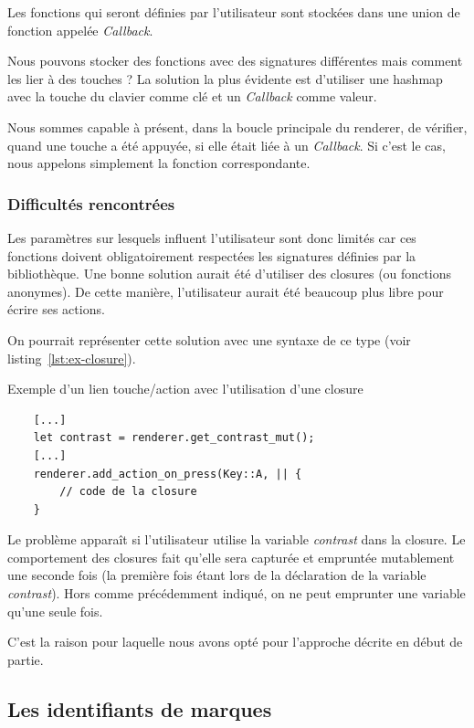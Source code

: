 \documentclass[12pt]{article}
\begin{document}
Les fonctions qui seront définies par l'utilisateur sont stockées dans une union de fonction appelée \textit{Callback}.

Nous pouvons stocker des fonctions avec des signatures différentes mais
comment les lier à des touches ?
La solution la plus évidente est d'utiliser une hashmap avec la touche du clavier comme clé et un \textit{Callback} comme valeur.

Nous sommes capable à présent, dans la boucle principale du renderer, de vérifier, quand
une touche a été appuyée, si elle était liée à un \textit{Callback}. Si c'est le cas,
nous appelons simplement la fonction correspondante.

\subsubsection{Difficultés rencontrées}

Les paramètres sur lesquels influent l'utilisateur sont donc limités car ces fonctions
doivent obligatoirement respectées les signatures définies par la bibliothèque.
Une bonne solution aurait été d'utiliser des closures (ou fonctions anonymes). De cette
manière, l'utilisateur aurait été beaucoup plus libre pour écrire ses actions.

On pourrait représenter cette solution avec une syntaxe de ce type
(voir listing~\ref{lst:ex-closure}).
\begin{listing}[H]
    \caption{Exemple d'un lien touche/action avec l'utilisation d'une closure}
    \begin{verbatim}
    [...]
    let contrast = renderer.get_contrast_mut();
    [...]
    renderer.add_action_on_press(Key::A, || {
        // code de la closure
    }
    \end{verbatim}
    \label{lst:ex-closure}
\end{listing}

Le problème apparaît si l'utilisateur utilise la variable \textit{contrast} dans la
closure. Le comportement des closures fait qu'elle sera capturée et empruntée
mutablement une seconde fois (la première fois étant lors de la déclaration de la
variable \textit{contrast}). Hors comme précédemment indiqué, on ne peut emprunter une
variable qu'une seule fois.

C'est la raison pour laquelle nous avons opté pour l'approche décrite en début de
partie.

\subsection{Les identifiants de marques}
\end{document}
